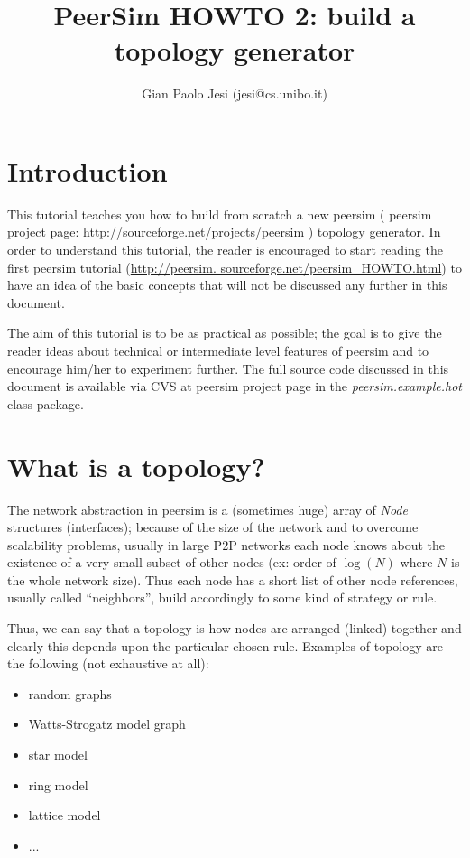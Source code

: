 \documentclass[a4paper,12pt]{article}
\title{PeerSim HOWTO 2: build a topology generator}
\author{Gian Paolo Jesi (jesi@cs.unibo.it)}
\begin{document}
\maketitle

\section{Introduction}

This tutorial teaches you how to build from scratch a new peersim
( peersim project page: \url{http://sourceforge.net/projects/peersim}
) topology generator. In order to understand this tutorial, the reader
is encouraged to start reading the first peersim tutorial 
(\url{http://peersim. sourceforge.net/peersim_HOWTO.html}) 
to have an idea of the basic concepts that will not be discussed any
further in this document. 

The aim of this tutorial is to be as practical as possible; the goal
is to give the reader ideas about technical or intermediate level
features of peersim and to encourage him/her to experiment further.
The full source code discussed in this document is available via CVS
at peersim project page in the \emph{peersim.example.hot} class package.


\section{What is a topology?}

The network abstraction in peersim is a (sometimes huge) array of
\emph{Node} structures (interfaces); because of the size of the network
and to overcome scalability problems, usually in large P2P networks
each node knows about the existence of a very small subset of other
nodes (ex: order of $\log(N)$ where $N$ is the whole network size). Thus
each node has a short list of other node references, usually called
``neighbors'', build accordingly to some kind of strategy
or rule. 

Thus, we can say that a topology is how nodes are arranged (linked)
together and clearly this depends upon the particular chosen rule.
Examples of topology are the following (not exhaustive at all): 

\begin{itemize}
\item random graphs 
\item Watts-Strogatz model graph 
\item star model 
\item ring model 
\item lattice model 
\item ...
\end{itemize}
\end{document}
